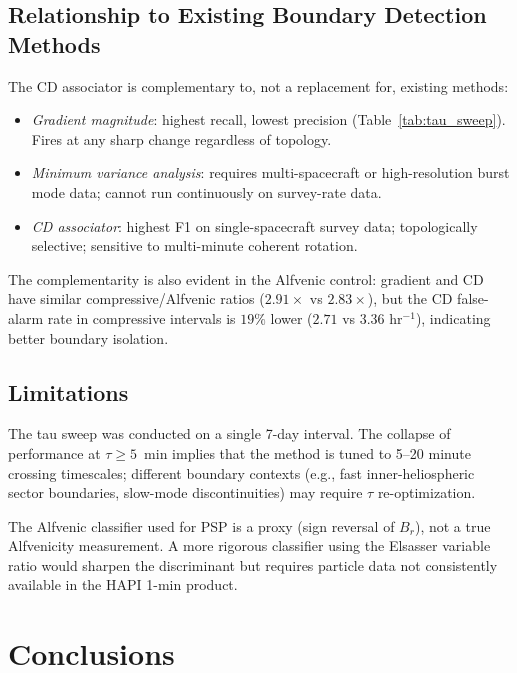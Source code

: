 \documentclass[draft]{agujournal2025}
\let\citep\cite%
\begin{document}
\subsection{Relationship to Existing Boundary Detection Methods}

The CD associator is complementary to, not a replacement for, existing methods:
\begin{itemize}
  \item \emph{Gradient magnitude}: highest recall, lowest precision (Table~\ref{tab:tau_sweep}).
    Fires at any sharp change regardless of topology.
  \item \emph{Minimum variance analysis}: requires multi-spacecraft or
    high-resolution burst mode data; cannot run continuously on survey-rate data.
  \item \emph{CD associator}: highest F1 on single-spacecraft survey data;
    topologically selective; sensitive to multi-minute coherent rotation.
\end{itemize}

The complementarity is also evident in the Alfvenic control: gradient and CD
have similar compressive/Alfvenic ratios ($2.91\times$ vs $2.83\times$), but
the CD false-alarm rate in compressive intervals is $19\%$ lower
($2.71$ vs $3.36$ hr$^{-1}$), indicating better boundary isolation.

\subsection{Limitations}

The tau sweep was conducted on a single 7-day interval.  The collapse of
performance at $\tau \geq 5$~min implies that the method is tuned to
5--20 minute crossing timescales; different boundary contexts
(e.g., fast inner-heliospheric sector boundaries, slow-mode discontinuities)
may require $\tau$ re-optimization.

The Alfvenic classifier used for PSP is a proxy (sign reversal of $B_r$),
not a true Alfvenicity measurement.  A more rigorous classifier using the
Elsasser variable ratio \citep{bavassano2000} would sharpen the discriminant
but requires particle data not consistently available in the HAPI 1-min product.

\section{Conclusions}
\label{sec:conclusions}
\end{document}
